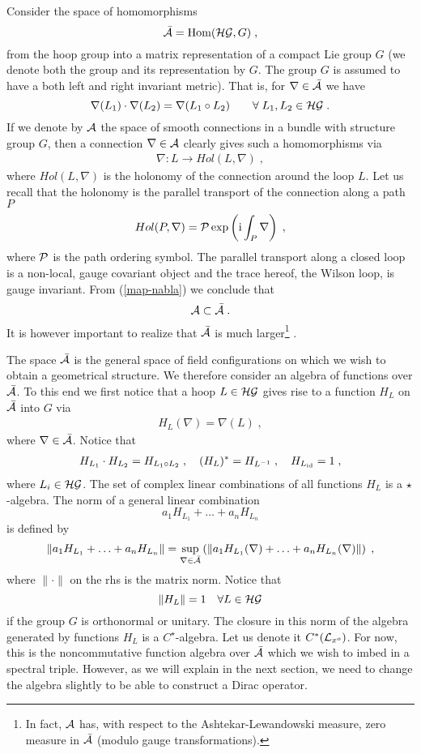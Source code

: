 \documentclass[12pt]{article}
\newcommand{\ba}{\begin{eqnarray}}
\newcommand{\ea}{\end{eqnarray}}
\def\ca{{\cal A}}
\def\cg{{\cal G}}
\def\ch{{\cal H}}
\def\cl{{\cal L}}
\def\cp{{\cal P}}
\newcommand{\One}{{\boldmath 1}}
\newcommand{\id}{\operatorname{id}}
\begin{document}
Consider the space of homomorphisms
\[
\bar{\ca}= \mbox{Hom}(\ch\cg,G)\;,
\]
from the hoop group into a matrix representation of a compact Lie group $G$ (we denote both the
group and its representation by $G$. The group $G$ is assumed to have a
both left and right invariant metric). That is, for $\nabla\in\bar{\ca}$ we
have
\[
\nabla(L_1)\cdot\nabla(L_2)=\nabla(L_1\circ L_2)\qquad\forall\; L_1,L_2\in\ch\cg\;.
\]
 If we
denote by $\ca$ the space of smooth connections in a bundle with structure group $G$,
then a connection $\nabla\in\ca$ clearly gives such a homomorphisms via
\ba
\nabla:L\rightarrow Hol(L,\nabla)\;,
\label{map-nabla}
\ea
where $Hol(L,\nabla)$ is the holonomy of the connection around the loop
$L$. Let us recall that the holonomy is the parallel
transport of the connection along a path $P$
\[
Hol(P,\nabla)=\cp \exp\left({\rm{i}}\int_P \nabla\right) \;,
\]
where $\cp$ is the path ordering symbol. The parallel transport along a closed
loop is a non-local, gauge covariant object and the trace
hereof, the Wilson loop, is gauge invariant. 
From (\ref{map-nabla}) we conclude that
\[
\ca\subset\bar{\ca}\;.
\]
It is however important to realize that
$\bar{\ca}$ is much larger\footnote{In fact, $\ca$ has, with respect to the
  Ashtekar-Lewandowski measure, zero measure in $\bar{\ca}$ (modulo gauge
  transformations). } \cite{Marolf:1994cj}.

The space $\bar{\ca}$ is the general space of field configurations on which we
wish to obtain a geometrical structure. We therefore consider an
algebra of functions over $\bar{\ca}$. To this end we first notice that
a hoop $L\in\ch\cg$ gives rise to a function $H_L$ on $\bar{\ca}$ into $G$ via
\ba
H_L(\nabla)=\nabla(L)\;,
\label{generators}
\ea
where $\nabla\in\bar{\ca}$. Notice that 
\ba
H_{L_1}\cdot H_{L_2}=H_{L_1\circ L_2}\;,\quad
(H_{L})^\ast = H_{L^{-1}}\;,\quad
H_{L_{\id}}= \One\;,\nonumber
\ea
where $L_i\in\ch\cg$. The set of complex linear combinations of all functions
$H_L$ is a $\star$-algebra. The norm of a general linear combination
\[
a_1 H_{L_1}+ \ldots + a_n H_{L_n}
\]
is defined by
\[
\| a_1 H_{L_1}+ \ldots + a_n H_{L_n} \| = \sup_{\nabla\in\bar{\ca}}\left(\|a_1
H_{L_1}(\nabla)  + \ldots + a_n H_{L_n}(\nabla)\|\right)\;,
\]
where $\| \cdot\|$ on the rhs is the matrix norm. Notice that 
\[
\| H_L \| =1\quad \forall L\in\ch\cg
\]
if the group $G$ is orthonormal or unitary. The closure in this norm of the algebra generated by functions $H_L$ is a $C^\star$-algebra.
Let us denote it $C^\ast(\cl_{x^o})$. For now, this is the noncommutative function algebra
over $\bar{\ca}$ which we wish to imbed in a spectral triple. However, as we
will explain in the next section, we need to change the algebra slightly to be
able to construct a Dirac operator.
\end{document}
